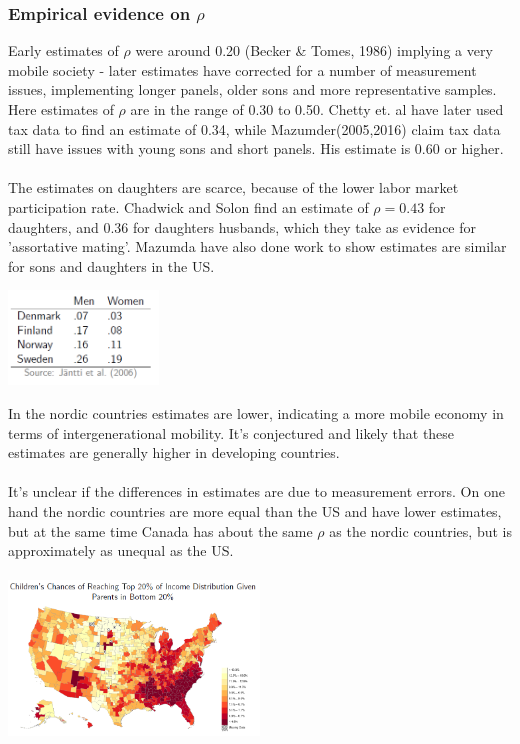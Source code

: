 \documentclass[12pt, a4paper]{article}
\begin{document}
\begin{multicols}{2}
\subsubsection{Empirical evidence on $\rho$}
Early estimates of $\rho$ were around 0.20 (Becker \& Tomes, 1986) implying a very mobile society - later estimates have corrected for a number of measurement issues, implementing longer panels, older sons and more representative samples. Here estimates of $\rho$ are in the range of 0.30 to 0.50. Chetty et. al have later used tax data to find an estimate of 0.34, while Mazumder(2005,2016) claim tax data still have issues with young sons and short panels. His estimate is 0.60 or higher.
\\ \\
The estimates on daughters are scarce, because of the lower labor market participation rate. Chadwick and Solon find an estimate of $\rho = 0.43$ for daughters, and 0.36 for daughters husbands, which they take as evidence for 'assortative mating'. Mazumda have also done work to show estimates are similar for sons and daughters in the US.
\begin{center}
\includegraphics[width = 0.3\textwidth]{rho.PNG}
\end{center}
In the nordic countries estimates are lower, indicating a more mobile economy in terms of intergenerational mobility. It's conjectured and likely that these estimates are generally higher in developing countries.
\\ \\
It's unclear if the differences in estimates are due to measurement errors. On one hand the nordic countries are more equal than the US and have lower estimates, but at the same time Canada has about the same $\rho$ as the nordic countries, but is approximately as unequal as the US.
\\ \\
\includegraphics[width = 0.5\textwidth]{map.PNG}


\end{multicols}
\end{document}
